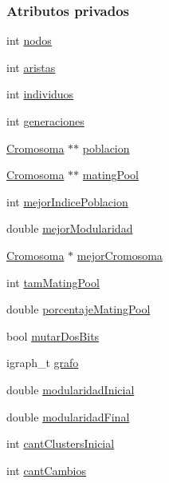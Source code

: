 \subsubsection*{Atributos privados}
\begin{DoxyCompactItemize}
\item 
int \hyperlink{class_algoritmo_a8b600a2b305e168f34896450a86330de}{nodos}
\item 
int \hyperlink{class_algoritmo_aebd547b83ffc0fc84727b4d32816e6a3}{aristas}
\item 
int \hyperlink{class_algoritmo_a5b2603327a6c450a76a6852ac26fe7a2}{individuos}
\item 
int \hyperlink{class_algoritmo_a76362b4a8f794e6206dcbeec3fe7a628}{generaciones}
\item 
\hyperlink{class_cromosoma}{Cromosoma} $\ast$$\ast$ \hyperlink{class_algoritmo_a5f6b839180abb11469b6e33cf2dd2871}{poblacion}
\item 
\hyperlink{class_cromosoma}{Cromosoma} $\ast$$\ast$ \hyperlink{class_algoritmo_a9c6c102ca50a3d69052d3c06ef19725c}{mating\-Pool}
\item 
int \hyperlink{class_algoritmo_aeda95cdb4165c41656c1a3e2e157eb51}{mejor\-Indice\-Poblacion}
\item 
double \hyperlink{class_algoritmo_a282ec70d907d6923b59c91e425ad493f}{mejor\-Modularidad}
\item 
\hyperlink{class_cromosoma}{Cromosoma} $\ast$ \hyperlink{class_algoritmo_a2bb44f3dd4096ece8959ed32b05b5147}{mejor\-Cromosoma}
\item 
int \hyperlink{class_algoritmo_a0c34d9a4f7a55fc4afa538dd477ac633}{tam\-Mating\-Pool}
\item 
double \hyperlink{class_algoritmo_a8423d3ea20137a281055f4b04f1d5492}{porcentaje\-Mating\-Pool}
\item 
bool \hyperlink{class_algoritmo_a128d4c2bd8d16eb3cb94f29f75ce33de}{mutar\-Dos\-Bits}
\item 
igraph\-\_\-t \hyperlink{class_algoritmo_a5bf75458f302256836f8c021c696b6d6}{grafo}
\item 
double \hyperlink{class_algoritmo_a2aff6cb6814150fe6abdf5a3458765f8}{modularidad\-Inicial}
\item 
double \hyperlink{class_algoritmo_ad31bad8b81588053130542bc3ffb3d06}{modularidad\-Final}
\item 
int \hyperlink{class_algoritmo_a740325de9f0e126452afbf5bce34bbc7}{cant\-Clusters\-Inicial}
\item 
int \hyperlink{class_algoritmo_a4b3baaedefed9ee655a1d1819b78a5df}{cant\-Cambios}

\end{DoxyCompactItemize}
